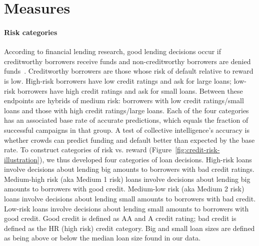 \documentclass[sigconf]{acmart}
\begin{document}
\section{Measures}\label{sec:measures}

\paragraph{Risk categories} 
According to financial lending research, good lending decisions occur if creditworthy borrowers receive funds and non-creditworthy borrowers are denied funds~\cite{abdou2011credit}. Creditworthy borrowers are those whose risk of default relative to reward is low. High-risk borrowers have low credit ratings and ask for large loans; low-risk borrowers have high credit ratings and ask for small loans. Between these endpoints are hybrids of medium risk: borrowers with low credit ratings/small loans and those with high credit ratings/large loans. Each of the four categories has an associated base rate of accurate predictions, which equals the fraction of successful campaigns in that group. A test of collective intelligence's accuracy is whether crowds can predict funding and default better than expected by the base rate. To construct categories of risk vs. reward (Figure~\ref{fig:credit-risk-illustration}), we thus developed four categories of loan decisions. High-risk loans involve decisions about lending big amounts to borrowers with bad credit ratings. Medium-high risk (aka Medium 1 risk) loans involve decisions about lending big amounts to borrowers with good credit. Medium-low risk (aka Medium 2 risk) loans involve decisions about lending small amounts to borrowers with bad credit. Low-risk loans involve decisions about lending small amounts to borrowers with good credit. Good credit is defined as AA and A credit rating; bad credit is defined as the HR (high risk) credit category. Big and small loan sizes are defined as being above or below the median loan size found in our data.
\end{document}
